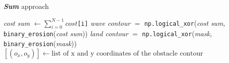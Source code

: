 \begin{algorithm}[h]
	\caption{\textbf{\textit{Sum}} approach}\label{summing}
	\textit{cost sum} $\gets \sum_{i=0}^{N-1} cost$\texttt{[i]}\;
	\textit{wave contour} $=$ \texttt{np.logical\_xor}(\textit{\small cost sum,} \texttt{binary\_erosion}(\textit{\small cost sum}))\;
	\textit{land contour} $=$ \texttt{np.logical\_xor}(\textit{mask,} \texttt{binary\_erosion}(\textit{mask}))\;
	$[(o_x,o_y)]\gets \text{list of x and y coordinates of the obstacle contour}$
\end{algorithm}

